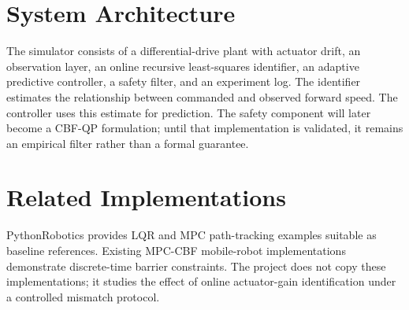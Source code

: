 \documentclass[11pt,a4paper]{article}
\begin{document}
\section{System Architecture}
The simulator consists of a differential-drive plant with actuator drift, an observation layer, an online recursive least-squares identifier, an adaptive predictive controller, a safety filter, and an experiment log. The identifier estimates the relationship between commanded and observed forward speed. The controller uses this estimate for prediction. The safety component will later become a CBF-QP formulation; until that implementation is validated, it remains an empirical filter rather than a formal guarantee.

\section{Related Implementations}
PythonRobotics provides LQR and MPC path-tracking examples suitable as baseline references. Existing MPC-CBF mobile-robot implementations demonstrate discrete-time barrier constraints. The project does not copy these implementations; it studies the effect of online actuator-gain identification under a controlled mismatch protocol.

\printbibliography
\end{document}
